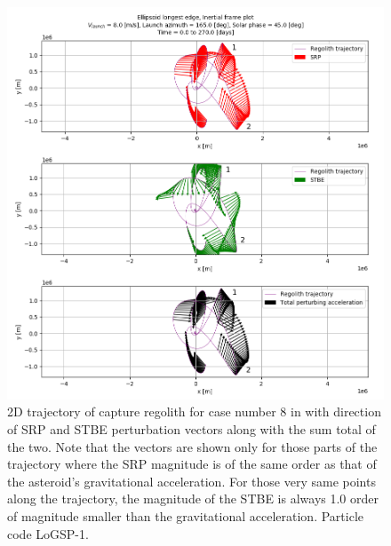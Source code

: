 \begin{figure}[htb]
\centering
\captionsetup{justification=centering}
\includegraphics[width=\textwidth, height=\textheight]{longest_edge_perturbations/3.2Density_1cmSize/TotalPerturbingVector_xyPlane_completeTraj_8ms_165DegAzim_45SolarPhase_edit.png}
\caption{2D trajectory of capture regolith for case number 8 in  with direction of \gls{SRP} and \gls{STBE} perturbation vectors along with the sum total of the two. Note that the vectors are shown only for those parts of the trajectory where the \gls{SRP} magnitude is of the same order as that of the asteroid's gravitational acceleration. For those very same points along the trajectory, the magnitude of the \gls{STBE} is always 1.0 order of magnitude smaller than the gravitational acceleration. Particle code LoGSP-1.}
\label{fig:LoGSP_1_capture_case_8_2d_trajectory_perturbationVectors}
\end{figure}
\FloatBarrier
